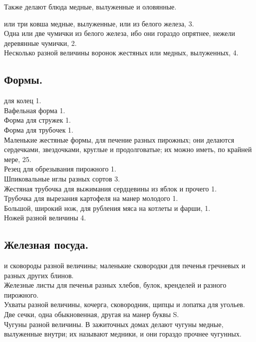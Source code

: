 Также делают блюда медные, вылуженные и оловянные.

 или три ковша медные, вылуженные, или из белого железа, 3.\\
Одна или две чумички из белого железа, ибо они гораздо опрятнее, нежели деревянные чумички, 2.\\
Несколько разной величины воронок жестяных или медных, вылуженных, 4.

\subsection{Формы.}
 для колец 1.\\
Вафельная форма 1.\\
Форма для стружек 1.\\
Форма для трубочек 1.\\
Маленькие жестяные формы, для печение разных пирожных; они делаются сердечками, звездочками, круглые и продолговатые; их можно иметь, по крайней мере, 25.\\
Резец для обрезывания пирожного 1.\\
Шпиковальные иглы разных сортов 3.\\
Жестяная трубочка для выжимания сердцевины из яблок и прочего 1.\\
Трубочка для вырезания картофеля на манер молодого 1.\\
Большой, широкий нож, для рубления мяса на котлеты и фарши, 1.\\
Ножей разной величины 4.

\subsection{Железная посуда.}
 и сковороды разной величины; маленькие сковородки для печенья гречневых и разных других блинов.\\
Железные листы для печенья разных хлебов, булок, кренделей и разного пирожного.\\
Ухваты разной величины, кочерга, сковородник, щипцы и лопатка для угольев.\\
Две сечки, одна обыкновенная, другая на манер буквы S.\\
Чугуны разной величины. В зажиточных домах делают чугуны медные, вылуженные внутри; их называют медники, и они гораздо прочнее чугунных.

